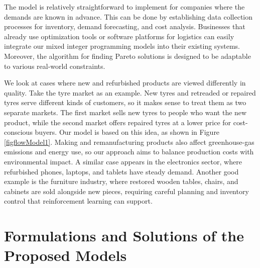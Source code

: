 \documentclass[11pt]{article}
\begin{document}
\noindent The model is relatively straightforward to implement for companies where the demands are known in advance. This can be done by establishing data collection processes for inventory, demand forecasting, and cost analysis. Businesses that already use optimization tools or software platforms for logistics can easily integrate our mixed integer programming models into their existing systems. Moreover, the algorithm for finding Pareto solutions is designed to be adaptable to various real-world constraints.

\noindent We look at cases where new and refurbished products are viewed differently in quality. Take the tyre market as an example. New tyres and retreaded or repaired tyres serve different kinds of customers, so it makes sense to treat them as two separate markets. The first market sells new tyres to people who want the new product, while the second market offers repaired tyres at a lower price for cost-conscious buyers. Our model is based on this idea, as shown in Figure \ref{figflowModel1}. Making and remanufacturing products also affect greenhouse-gas emissions and energy use, so our approach aims to balance production costs with environmental impact. A similar case appears in the electronics sector, where refurbished phones, laptops, and tablets have steady demand. Another good example is the furniture industry, where restored wooden tables, chairs, and cabinets are sold alongside new pieces, requiring careful planning and inventory control that reinforcement learning can support.



\section{Formulations and Solutions of the Proposed Models }\label{Form}
\end{document}
